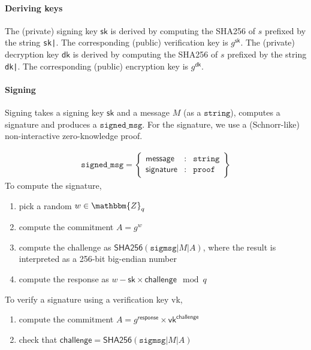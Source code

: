 \documentclass[a4paper]{article}
\newcommand{\Z}{\mathbbm{Z}}
\newcommand{\jstring}{\texttt{string}}
\begin{document}
\paragraph{Deriving keys}

The (private) signing key $\textsf{sk}$ is derived by computing the
SHA256 of $s$ prefixed by the string \verb/sk|/. The corresponding
(public) verification key is $g^{\textsf{sk}}$. The (private)
decryption key $\textsf{dk}$ is derived by computing the SHA256 of $s$
prefixed by the string \verb/dk|/. The corresponding (public)
encryption key is $g^{\textsf{dk}}$.

\paragraph{Signing}

Signing takes a signing key $\textsf{sk}$ and a \textsf{message} $M$
(as a $\jstring$), computes a \textsf{signature} and produces a
$\texttt{signed\_msg}$. For the signature, we use a (Schnorr-like)
non-interactive zero-knowledge proof.

\begin{gather*}
  \texttt{signed\_msg}=\left\{
    \begin{array}{rcl}
      \textsf{message}&:&\jstring\\
      \textsf{signature}&:&\texttt{proof}
    \end{array}
  \right\}
\end{gather*}
To compute the \textsf{signature},
\begin{enumerate}
\item pick a random $w\in\Z_q$
\item compute the commitment $A=g^w$
\item compute the \textsf{challenge} as
  $\textsf{SHA256}(\texttt{sigmsg|}M\texttt{|}A)$, where
  the result is interpreted as a 256-bit big-endian
  number
\item compute the \textsf{response} as
  $w-\textsf{sk}\times\textsf{challenge}\mod q$
\end{enumerate}
To verify a \textsf{signature} using a verification key \textsf{vk},
\begin{enumerate}
\item compute the commitment $A=g^{\textsf{response}}\times\textsf{vk}^{\textsf{challenge}}$
\item check that $\textsf{challenge}=\textsf{SHA256}(\texttt{sigmsg|}M\texttt{|}A)$
\end{enumerate}
\end{document}
